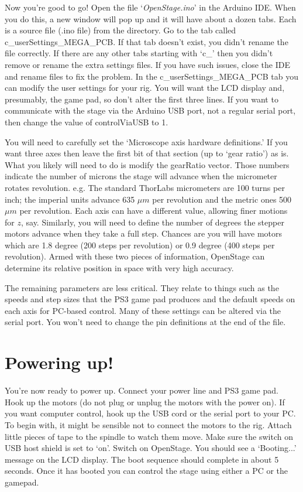 \documentclass[11pt]{report} %
\begin{document}
Now you're good to go! Open the file `\textit{OpenStage.ino}' in the Arduino IDE. When you do this, a new window will pop up and it will have about a dozen tabs. Each is a source file (.ino file) from the directory. Go to the tab called c\_userSettings\_MEGA\_PCB. If that tab doesn't exist, you didn't rename the file correctly. If there are any other tabs starting with `c\_' then you didn't remove or rename the extra settings files. If you have such issues, close the IDE and rename files to fix the problem. In the c\_userSettings\_MEGA\_PCB tab you can modify the user settings for your rig. You will want the LCD display and, presumably, the game pad, so don't alter the first three lines. If you want to communicate with the stage via the Arduino USB port, not a regular serial port, then change the value of controlViaUSB to 1. 

You will need to carefully set the `Microscope axis hardware definitions.' If you want three axes then leave the first bit of that section (up to `gear ratio') as is. What you likely will need to do is modify the gearRatio vector. Those numbers indicate the number of microns the stage will advance when the micrometer rotates revolution. e.g. The standard ThorLabs micrometers are 100 turns per inch; the imperial units advance 635 $\mu m$ per revolution and the metric ones 500 $\mu m$ per revolution. Each axis can have a different value, allowing finer motions for $z$, say. Similarly, you will need to define the number of degrees the stepper motors advance when they take a full step. Chances are you will have motors which are 1.8 degree (200 steps per revolution) or 0.9 degree (400 steps per revolution). Armed with these two pieces of information, OpenStage can determine its relative position in space with very high accuracy. 

The remaining parameters are less critical. They relate to things such as the speeds and step sizes that the PS3 game pad produces and the default speeds on each axis for PC-based control. Many of these settings can be altered via the serial port. You won't need to change the pin definitions at the end of the file. 

\section{Powering up!}
You're now ready to power up. Connect your power line and PS3 game pad. Hook up the motors (do not plug or unplug the motors with the power on). If you want computer control, hook up the USB cord or the serial port to your PC. To begin with, it might be sensible not to connect the motors to the rig. Attach little pieces of tape to the spindle to watch them move. Make sure the switch on USB host shield is set to `on'. Switch on OpenStage. You should see a `Booting...' message on the LCD display. The boot sequence should complete in about 5 seconds. Once it has booted you can control the stage using either a PC or the gamepad. 
\end{document}
